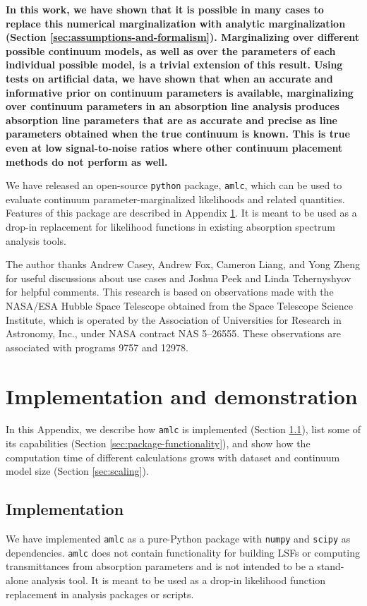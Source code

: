 \documentclass[manuscript]{aastex62}
\newcommand{\pkgname}{\texttt{amlc}}
\begin{document}
{\bf
In this work, we have shown that it is possible in many cases to replace this numerical marginalization with analytic marginalization (Section \ref{sec:assumptions-and-formalism}).
Marginalizing over different possible continuum models, as well as over the parameters of each individual possible model, is a trivial extension of this result.
Using tests on artificial data, we have shown that when an accurate and informative prior on continuum parameters is available, marginalizing over continuum parameters in an absorption line analysis produces absorption line parameters that are as accurate and precise as line parameters obtained when the true continuum is known.
This is true even at low signal-to-noise ratios where other continuum placement methods do not perform as well.
}

We have released an open-source \texttt{python} package, \pkgname, which can be used to evaluate continuum parameter-marginalized likelihoods and related quantities.
Features of this package are described in Appendix \ref{sec:package-and-demos}.
It is meant to be used as a drop-in replacement for likelihood functions in existing absorption spectrum analysis tools.

\acknowledgments
The author thanks Andrew Casey, Andrew Fox, Cameron Liang, and Yong Zheng for useful discussions about use cases and Joshua Peek and Linda Tchernyshyov for helpful comments.
This research is based on observations made with the NASA/ESA Hubble Space Telescope obtained from the Space Telescope Science Institute, which is operated by the Association of Universities for Research in Astronomy, Inc., under NASA contract NAS 5–26555. These observations are associated with programs 9757 and 12978.


\appendix

\section{Implementation and demonstration}
\label{sec:package-and-demos}
In this Appendix, we describe how \pkgname{} is implemented (Section \ref{sec:implementation}), list some of its capabilities (Section \ref{sec:package-functionality}), and show how the computation time of different calculations grows with dataset and continuum model size (Section \ref{sec:scaling}).

\subsection{Implementation}
\label{sec:implementation}
We have implemented \pkgname{} as a pure-Python package with \texttt{numpy} and \texttt{scipy} as dependencies.
\pkgname{} does not contain functionality for building LSFs or computing transmittances from absorption parameters and is not intended to be a stand-alone analysis tool.
It is meant to be used as a drop-in likelihood function replacement in analysis packages or scripts.
\end{document}
